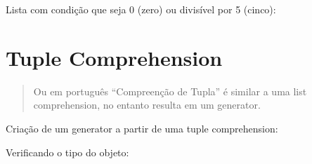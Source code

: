 \documentclass[letterpaper,10pt,brazil]{sphinxmanual}
\begin{document}
\begin{sphinxVerbatim}[commandchars=\\\{\}]
\end{sphinxVerbatim}

Lista com condição que seja 0 (zero) ou divisível por 5 (cinco):

\begin{sphinxVerbatim}[commandchars=\\\{\}]
\PYG{p}{[}          \PYG{p}{]}
\end{sphinxVerbatim}

\begin{sphinxVerbatim}[commandchars=\\\{\}]
\end{sphinxVerbatim}


\section{Tuple Comprehension}
\label{\detokenize{content/sequences:tuple-comprehension}}\begin{quote}

Ou em português “Compreenção de Tupla” é similar a uma list comprehension, no entanto resulta em um generator.
\end{quote}

Criação de um generator a partir de uma tuple comprehension:

\begin{sphinxVerbatim}[commandchars=\\\{\}]
      
\end{sphinxVerbatim}

Verificando o tipo do objeto:

\begin{sphinxVerbatim}[commandchars=\\\{\}]
\end{sphinxVerbatim}

\begin{sphinxVerbatim}[commandchars=\\\{\}]
\end{sphinxVerbatim}
\end{document}
